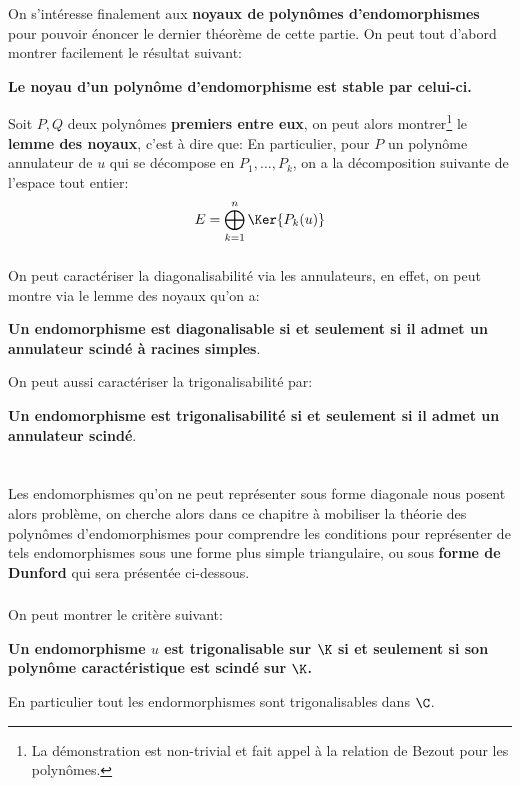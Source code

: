 \subsection*{}
On s'intéresse finalement aux \textbf{noyaux de polynômes d'endomorphismes} pour pouvoir énoncer le dernier théorème de cette partie. On peut tout d'abord montrer facilement le résultat suivant:
\begin{center}
   \textbf{Le noyau d'un polynôme d'endomorphisme est stable par celui-ci.}
\end{center}
Soit \(P, Q\) deux polynômes \textbf{premiers entre eux}, on peut alors montrer\footnote[1]{La démonstration est non-trivial et fait appel à la relation de Bezout pour les polynômes.} le \textbf{lemme des noyaux}, c'est à dire que:
En particulier, pour \(P\) un polynôme annulateur de \(u\) qui se décompose en \(P_1, \ldots, P_k\), on a la décomposition suivante de l'espace tout entier:
\[
   E = \bigoplus_{k=1}^n \Ker{P_k(u)}
\]
\subsection*{}
On peut caractériser la diagonalisabilité via les annulateurs, en effet, on peut montre via le lemme des noyaux qu'on a:
\begin{center}
   \textbf{Un endomorphisme est diagonalisable si et seulement si il admet un annulateur scindé à racines simples}.
\end{center}
On peut aussi caractériser la trigonalisabilité par:
\begin{center}
   \textbf{Un endomorphisme est trigonalisabilité si et seulement si il admet un annulateur scindé}.
\end{center}
\chapter*{}
Les endomorphismes qu'on ne peut représenter sous forme diagonale nous posent alors problème, on cherche alors dans ce chapitre à mobiliser la théorie des polynômes d'endomorphismes pour comprendre les conditions pour représenter de tels endomorphismes sous une forme plus simple triangulaire, ou sous \textbf{forme de Dunford} qui sera présentée ci-dessous.

\subsection*{}
On peut montrer le critère suivant:
\begin{center}
   \textbf{Un endomorphisme \(u\) est trigonalisable sur \(\K\) si et seulement si son polynôme caractéristique est scindé sur \(\K\).}
\end{center}
En particulier tout les endormorphismes sont trigonalisables dans \(\C\).\<

